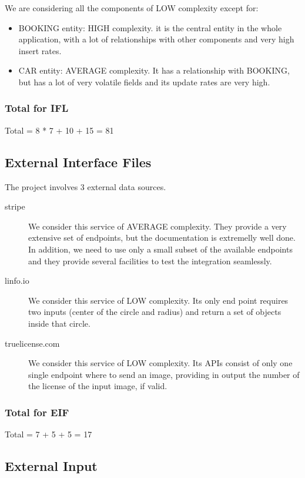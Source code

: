 \documentclass[11pt]{article} %
\begin{document}
We are considering all the components of LOW complexity except for:
\begin{itemize}[noitemsep]
	\item BOOKING entity: HIGH complexity. it is the central entity in the whole application, with a lot of relationships with other components and very high insert rates.
	\item CAR entity: AVERAGE complexity. It has a relationship with BOOKING, but has a lot of very volatile fields and its update rates are very high.
\end{itemize}

\subsubsection{Total for IFL}
Total = 8 * 7 + 10 + 15 =  81


\subsection{External Interface Files}

The project involves 3 external data sources.

\begin{description}
	\item[stripe] We consider this service of AVERAGE complexity. They provide a very extensive set of endpoints, but the documentation is extremelly well done. In addition, we need to use only a small subset of the available endpoints and they provide several facilities to test the integration seamlessly.
	\item[linfo.io] We consider this service of LOW complexity. Its only end point requires two inputs (center of the circle and radius) and return a set of objects inside that circle.
	\item[truelicense.com] We consider this service of LOW complexity. Its APIs consist of only one single endpoint where to send an image, providing in output the number of the license of the input image, if valid.
\end{description}

\subsubsection{Total for EIF}
Total = 7 + 5 + 5 = 17

\subsection{External Input}
\end{document}
